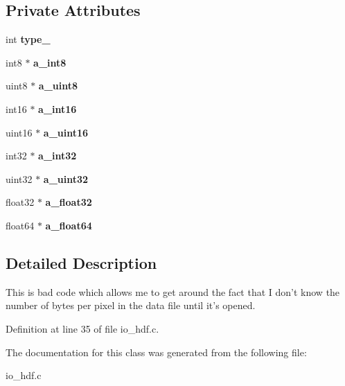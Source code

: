 \subsection*{Private Attributes}
\begin{CompactItemize}
\item 
int \bf{type\_\-}\label{classhdf__anonymous__array_5338d62c29dc576c1e5a471adc45c193}

\item 
int8 $\ast$ \bf{a\_\-int8}\label{classhdf__anonymous__array_783a906d8d92749efba6b94baa673dcd}

\item 
uint8 $\ast$ \bf{a\_\-uint8}\label{classhdf__anonymous__array_58c836e1363553c821d45ac992c91785}

\item 
int16 $\ast$ \bf{a\_\-int16}\label{classhdf__anonymous__array_e15033988d0f8a2856bf16a31701103d}

\item 
uint16 $\ast$ \bf{a\_\-uint16}\label{classhdf__anonymous__array_bfb4e652c6f6db8620b7db83316353fb}

\item 
int32 $\ast$ \bf{a\_\-int32}\label{classhdf__anonymous__array_af611afdebfc5e5361b54f252791079d}

\item 
uint32 $\ast$ \bf{a\_\-uint32}\label{classhdf__anonymous__array_aad9e6b66938242fe6702bde5501135f}

\item 
float32 $\ast$ \bf{a\_\-float32}\label{classhdf__anonymous__array_42e22a584b836ee8a4777af569ecf780}

\item 
float64 $\ast$ \bf{a\_\-float64}\label{classhdf__anonymous__array_200196aadd178570dd9e02a30c2cfb1e}

\end{CompactItemize}


\subsection{Detailed Description}
This is bad code which allows me to get around the fact that I don't know the number of bytes per pixel in the data file until it's opened. 



Definition at line 35 of file io\_\-hdf.c.

The documentation for this class was generated from the following file:\begin{CompactItemize}
\item 
io\_\-hdf.c\end{CompactItemize}
